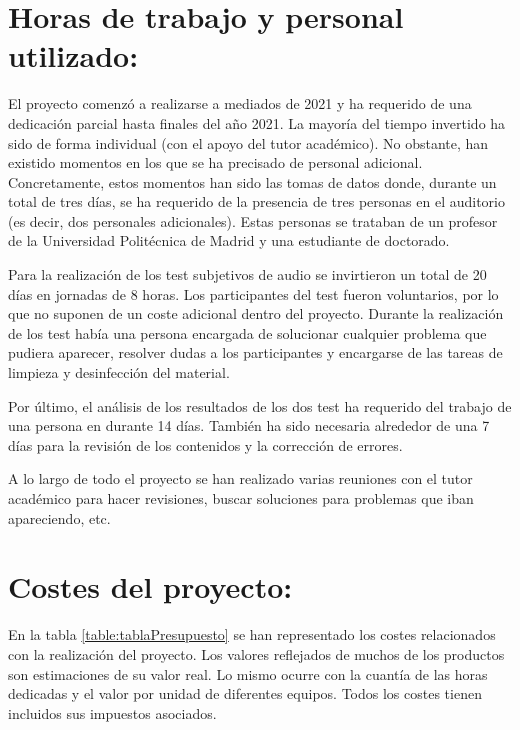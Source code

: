 \documentclass[11pt,a4paper,twoside]{book}
\begin{document}
    \section*{Horas de trabajo y personal utilizado:}
        El proyecto comenzó a realizarse a mediados de 2021 y ha requerido de una dedicación parcial hasta finales del año 2021. La mayoría del tiempo invertido ha sido de forma individual (con el apoyo del tutor académico). No obstante, han existido momentos en los que se ha precisado de personal adicional. Concretamente, estos momentos han sido las tomas de datos donde, durante un total de tres días, se ha requerido de la presencia de tres personas en el auditorio (es decir, dos personales adicionales). Estas personas se trataban de un profesor de la Universidad Politécnica de Madrid y una estudiante de doctorado.
        
        Para la realización de los test subjetivos de audio se invirtieron un total de 20 días en jornadas de 8 horas. Los participantes del test fueron voluntarios, por lo que no suponen de un coste adicional dentro del proyecto. Durante la realización de los test había una persona encargada de solucionar cualquier problema que pudiera aparecer, resolver dudas a los participantes y encargarse de las tareas de limpieza y desinfección del material.
        
        Por último, el análisis de los resultados de los dos test ha requerido del trabajo de una persona en durante 14 días. También ha sido necesaria alrededor de una 7 días para la revisión de los contenidos y la corrección de errores.
        
        A lo largo de todo el proyecto se han realizado varias reuniones con el tutor académico para hacer revisiones, buscar soluciones para problemas que iban apareciendo, etc.
        
    \section*{Costes del proyecto:}
        En la tabla \ref{table:tablaPresupuesto} se han representado los costes relacionados con la realización del proyecto. Los valores reflejados de muchos de los productos son estimaciones de su valor real. Lo mismo ocurre con la cuantía de las horas dedicadas y el valor por unidad de diferentes equipos. Todos los costes tienen incluidos sus impuestos asociados.
        
\end{document}
